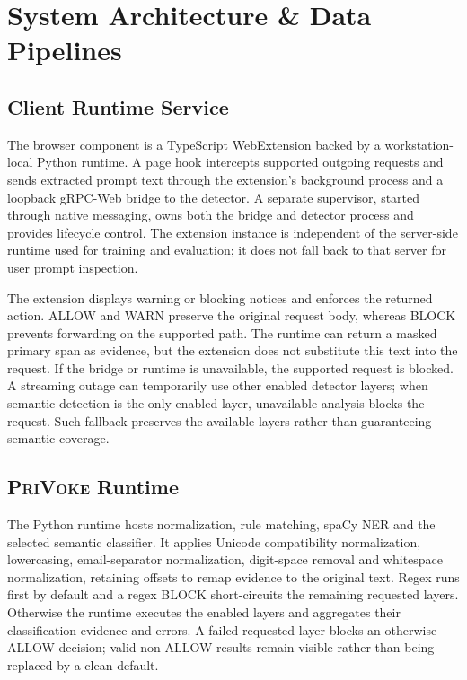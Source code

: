 \documentclass[conference]{IEEEtran}
\newcommand{\privoke}{\textsc{PriVoke}\xspace}
\begin{document}
\section{System Architecture \& Data Pipelines}
\label{sec:system_architecture}

\subsection{Client Runtime Service}

The browser component is a TypeScript WebExtension backed by a workstation-local Python runtime. A page hook intercepts supported outgoing requests and sends extracted prompt text through the extension's background process and a loopback gRPC-Web bridge to the detector. A separate supervisor, started through native messaging, owns both the bridge and detector process and provides lifecycle control. The extension instance is independent of the server-side runtime used for training and evaluation; it does not fall back to that server for user prompt inspection.

The extension displays warning or blocking notices and enforces the returned action. ALLOW and WARN preserve the original request body, whereas BLOCK prevents forwarding on the supported path. The runtime can return a masked primary span as evidence, but the extension does not substitute this text into the request. If the bridge or runtime is unavailable, the supported request is blocked. A streaming outage can temporarily use other enabled detector layers; when semantic detection is the only enabled layer, unavailable analysis blocks the request. Such fallback preserves the available layers rather than guaranteeing semantic coverage.

\subsection{\privoke Runtime}

The Python runtime hosts normalization, rule matching, spaCy NER and the selected semantic classifier. It applies Unicode compatibility normalization, lowercasing, email-separator normalization, digit-space removal and whitespace normalization, retaining offsets to remap evidence to the original text. Regex runs first by default and a regex BLOCK short-circuits the remaining requested layers. Otherwise the runtime executes the enabled layers and aggregates their classification evidence and errors. A failed requested layer blocks an otherwise ALLOW decision; valid non-ALLOW results remain visible rather than being replaced by a clean default.
\end{document}

